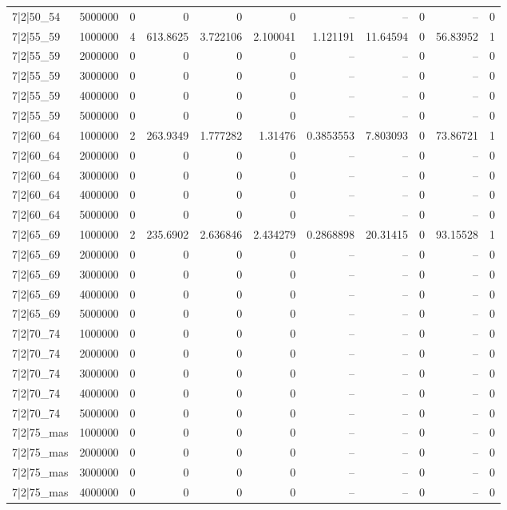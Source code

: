 \begin{tabular}{lrrrrrrrrrr}
7|2|50\_54 & 5000000 & 0 & 0 & 0 & 0 & -- & -- & 0 & -- & 0 \\
7|2|55\_59 & 1000000 & 4 & 613.8625 & 3.722106 & 2.100041 & 1.121191 & 11.64594 & 0 & 56.83952 & 1 \\
7|2|55\_59 & 2000000 & 0 & 0 & 0 & 0 & -- & -- & 0 & -- & 0 \\
7|2|55\_59 & 3000000 & 0 & 0 & 0 & 0 & -- & -- & 0 & -- & 0 \\
7|2|55\_59 & 4000000 & 0 & 0 & 0 & 0 & -- & -- & 0 & -- & 0 \\
7|2|55\_59 & 5000000 & 0 & 0 & 0 & 0 & -- & -- & 0 & -- & 0 \\
7|2|60\_64 & 1000000 & 2 & 263.9349 & 1.777282 & 1.31476 & 0.3853553 & 7.803093 & 0 & 73.86721 & 1 \\
7|2|60\_64 & 2000000 & 0 & 0 & 0 & 0 & -- & -- & 0 & -- & 0 \\
7|2|60\_64 & 3000000 & 0 & 0 & 0 & 0 & -- & -- & 0 & -- & 0 \\
7|2|60\_64 & 4000000 & 0 & 0 & 0 & 0 & -- & -- & 0 & -- & 0 \\
7|2|60\_64 & 5000000 & 0 & 0 & 0 & 0 & -- & -- & 0 & -- & 0 \\
7|2|65\_69 & 1000000 & 2 & 235.6902 & 2.636846 & 2.434279 & 0.2868898 & 20.31415 & 0 & 93.15528 & 1 \\
7|2|65\_69 & 2000000 & 0 & 0 & 0 & 0 & -- & -- & 0 & -- & 0 \\
7|2|65\_69 & 3000000 & 0 & 0 & 0 & 0 & -- & -- & 0 & -- & 0 \\
7|2|65\_69 & 4000000 & 0 & 0 & 0 & 0 & -- & -- & 0 & -- & 0 \\
7|2|65\_69 & 5000000 & 0 & 0 & 0 & 0 & -- & -- & 0 & -- & 0 \\
7|2|70\_74 & 1000000 & 0 & 0 & 0 & 0 & -- & -- & 0 & -- & 0 \\
7|2|70\_74 & 2000000 & 0 & 0 & 0 & 0 & -- & -- & 0 & -- & 0 \\
7|2|70\_74 & 3000000 & 0 & 0 & 0 & 0 & -- & -- & 0 & -- & 0 \\
7|2|70\_74 & 4000000 & 0 & 0 & 0 & 0 & -- & -- & 0 & -- & 0 \\
7|2|70\_74 & 5000000 & 0 & 0 & 0 & 0 & -- & -- & 0 & -- & 0 \\
7|2|75\_mas & 1000000 & 0 & 0 & 0 & 0 & -- & -- & 0 & -- & 0 \\
7|2|75\_mas & 2000000 & 0 & 0 & 0 & 0 & -- & -- & 0 & -- & 0 \\
7|2|75\_mas & 3000000 & 0 & 0 & 0 & 0 & -- & -- & 0 & -- & 0 \\
7|2|75\_mas & 4000000 & 0 & 0 & 0 & 0 & -- & -- & 0 & -- & 0 \\

\end{tabular}
